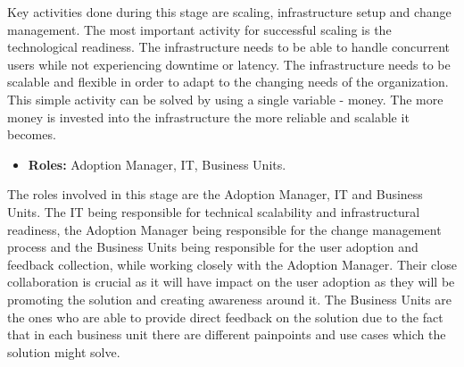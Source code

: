 \documentclass[]{imc-inf}
\def\tightlist{}
\begin{document}
Key activities done during this stage are scaling, infrastructure setup
and change management. The most important activity for successful
scaling is the technological readiness. The infrastructure needs to be
able to handle concurrent users while not experiencing downtime or
latency. The infrastructure needs to be scalable and flexible in order
to adapt to the changing needs of the organization. This simple activity
can be solved by using a single variable - money. The more money is
invested into the infrastructure the more reliable and scalable it
becomes.

\begin{itemize}
	\tightlist
	\item
	\textbf{Roles:} Adoption Manager, IT, Business Units.
\end{itemize}

The roles involved in this stage are the Adoption Manager, IT and
Business Units. The IT being responsible for technical scalability and
infrastructural readiness, the Adoption Manager being responsible for
the change management process and the Business Units being responsible
for the user adoption and feedback collection, while working closely
with the Adoption Manager. Their close collaboration is crucial as it
will have impact on the user adoption as they will be promoting the
solution and creating awareness around it. The Business Units are the
ones who are able to provide direct feedback on the solution due to the
fact that in each business unit there are different painpoints and use
cases which the solution might solve.
\end{document}
